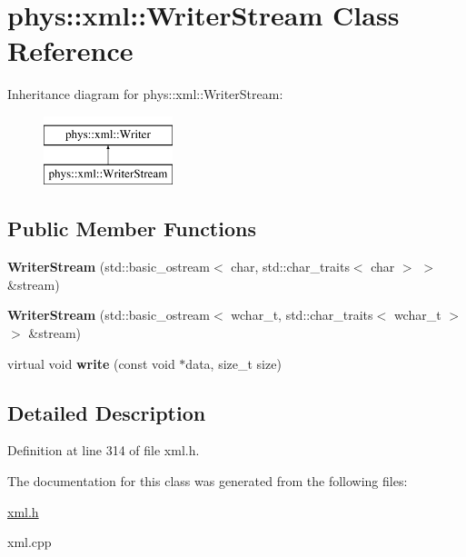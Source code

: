\hypertarget{classphys_1_1xml_1_1WriterStream}{
\section{phys::xml::WriterStream Class Reference}
\label{d5/d6f/classphys_1_1xml_1_1WriterStream}
}
Inheritance diagram for phys::xml::WriterStream:\begin{figure}[H]
\begin{center}
\leavevmode
\includegraphics[height=2.000000cm]{d5/d6f/classphys_1_1xml_1_1WriterStream}
\end{center}
\end{figure}
\subsection*{Public Member Functions}
\begin{DoxyCompactItemize}
\item 
\hypertarget{classphys_1_1xml_1_1WriterStream_ae170ab7c429b6f7149d3540243329dfa}{
{\bfseries WriterStream} (std::basic\_\-ostream$<$ char, std::char\_\-traits$<$ char $>$ $>$ \&stream)}
\label{d5/d6f/classphys_1_1xml_1_1WriterStream_ae170ab7c429b6f7149d3540243329dfa}

\item 
\hypertarget{classphys_1_1xml_1_1WriterStream_aaebcd545af8e44cf6556a46077f0a366}{
{\bfseries WriterStream} (std::basic\_\-ostream$<$ wchar\_\-t, std::char\_\-traits$<$ wchar\_\-t $>$ $>$ \&stream)}
\label{d5/d6f/classphys_1_1xml_1_1WriterStream_aaebcd545af8e44cf6556a46077f0a366}

\item 
\hypertarget{classphys_1_1xml_1_1WriterStream_a9b51cb20d4367df5d7294277490781dd}{
virtual void {\bfseries write} (const void $\ast$data, size\_\-t size)}
\label{d5/d6f/classphys_1_1xml_1_1WriterStream_a9b51cb20d4367df5d7294277490781dd}

\end{DoxyCompactItemize}


\subsection{Detailed Description}


Definition at line 314 of file xml.h.



The documentation for this class was generated from the following files:\begin{DoxyCompactItemize}
\item 
\hyperlink{xml_8h}{xml.h}\item 
xml.cpp\end{DoxyCompactItemize}
